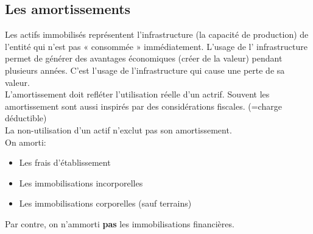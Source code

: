\documentclass{article}
\begin{document}
\subsection{Les amortissements}
Les actifs immobilisés représentent l’infrastructure (la capacité de production) de l’entité qui n’est pas « consommée » immédiatement. L’usage de l’ infrastructure permet de générer des avantages économiques (créer de la valeur) pendant plusieurs années. C’est l’usage de l’infrastructure qui cause une perte de sa valeur. \\
L'amortissement doit refléter l'utilisation réelle d'un actrif. Souvent les amortissement sont aussi inspirés par des considérations fiscales. (=charge déductible)\\
La non-utilisation d'un actif n'exclut pas son amortissement.\\
On amorti:
\begin{itemize}
    \item Les frais d'établissement
    \item Les immobilisations incorporelles
    \item Les immobilisations corporelles (sauf terrains)
\end{itemize}
Par contre, on n'ammorti \textbf{pas} les immobilisations financières. \\
\end{document}
